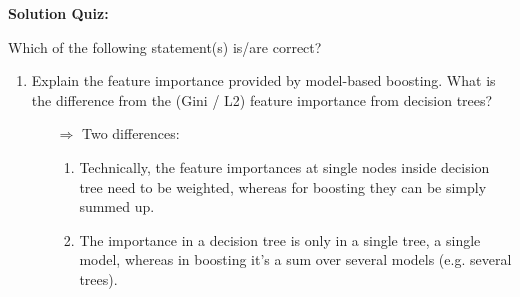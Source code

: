 \textbf{Solution Quiz:}\\\noindent
\medskip

Which of the following statement(s) is/are correct?  
	\begin{enumerate}
        \item Explain the feature importance provided by model-based boosting. What is the difference from the (Gini / L2) feature importance from decision trees?
        \begin{itemize}
            \item[$\Rightarrow$] Two differences:
            \begin{enumerate}
                \item Technically, the feature importances at single nodes inside decision tree need to be weighted, whereas for boosting they can be simply summed up.
                \item The importance in a decision tree is only in a single tree, a single model, whereas in boosting it's a sum over several models (e.g. several trees).
            \end{enumerate}
        \end{itemize}
    	
	\end{enumerate}
